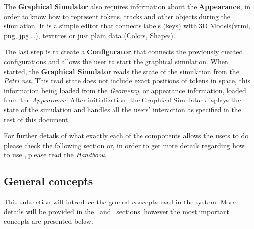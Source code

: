The \textbf{Graphical Simulator} also requires information about the \textbf{Appearance}, in order
to know how to represent tokens, tracks and other objects during the simulation. It is a simple
editor that connects labels (keys) with 3D Models(vrml, png, jpg \ldots), textures or just plain
data (Colors, Shapes).
  
The last step is to create a \textbf{Configurator} that connects the previously created
configurations and allows the user to start the graphical simulation. When started, the
\textbf{Graphical Simulator} reads the state of the simulation from the \textit{Petri net}. This read
state does not include exact positions of tokens in space, this information being loaded from the
\textit{Geometry}, or appearance information, loaded from the \textit{Appearance}. After
initialization, the Graphical Simulator displays the state of the simulation and handles all the
users' interaction as specified in the rest of this document.

For further details of what exactly each of the components allows the users to do please check the
following section or, in order to get more details regarding how to use \epns, please read the
\textit{Handbook}.

\subsection{General concepts}
\label{oa:generalconcepts}
This subsection will introduce the general concepts used in the \epns system. More details will be
provided in the~ and~ sections, however the
most important concepts are presented below.

